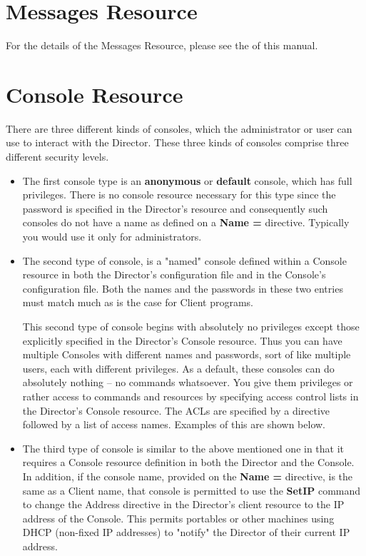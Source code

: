 \section{Messages Resource}
\label{DirectorResourceMessages}

For the details of the Messages Resource, please see the
 of this
manual.

\section{Console Resource}
\label{DirectorResourceConsole}

There are three different kinds of consoles, which the administrator or
user can use to interact with the Director. These three kinds of consoles
comprise three different security levels.

\begin{itemize}
\item The first console type is an {\bf anonymous} or {\bf default}  console,
which has full privileges.  There is no console resource necessary for
this type since the password is specified in the Director's resource and
consequently such consoles do not have a name as defined on a {\bf Name
=} directive.  Typically you
would use it only for  administrators.

\item The second type of console, is a
"named" console defined within a Console resource in both the Director's
configuration file and in the Console's configuration file.  Both the
names and the passwords in these two entries must match much as is the
case for Client programs.

This second type of console begins with absolutely no privileges except
those explicitly specified in the Director's Console resource.  Thus you
can have multiple Consoles with different names and passwords, sort of
like multiple users, each with different privileges.  As a default,
these consoles can do absolutely nothing -- no commands whatsoever.  You
give them privileges or rather access to commands and resources by
specifying access control lists in the Director's Console resource.  The
ACLs are specified by a directive followed by a list of access names.
Examples of this are shown below.

\item The third type of console is similar to the above mentioned  one in that
it requires a Console resource definition in both the Director and the
Console.  In addition, if the console name, provided on the {\bf Name =}
directive, is the same as a Client name, that console is permitted to
use the {\bf SetIP} command to change the Address directive in the
Director's client resource to the IP address of the Console.  This
permits portables or other machines using DHCP (non-fixed IP addresses)
to "notify" the Director of their current IP address.
\end{itemize}

